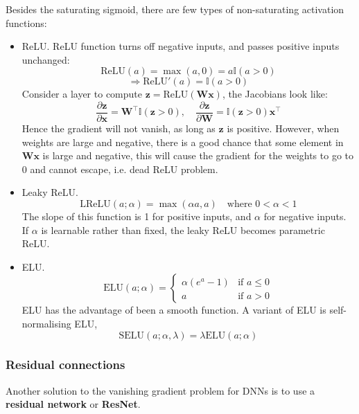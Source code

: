 \documentclass[11pt]{article}
\begin{document}
Besides the saturating sigmoid, there are few types of non-saturating activation functions:
\begin{itemize}
    \item ReLU. ReLU function turns off negative inputs, and passes positive inputs unchanged:
    \[
    \text{ReLU}(a) = \max (a, 0) = a \mathbb{I}(a>0)
    \]
    \[
    \Rightarrow \text{ReLU}'(a) = \mathbb{I}(a>0)
    \]
    Consider a layer to compute $\boldsymbol{z} = \text{ReLU}(\mathbf{W} \boldsymbol{x})$, the Jacobians look like:
    \[
    \frac{\partial \boldsymbol{z}}{\partial \boldsymbol{x}} = \mathbf{W}^\top \mathbb{I}(\boldsymbol{z} > 0) , \quad
    \frac{\partial \boldsymbol{z}}{\partial \mathbf{W}} = \mathbb{I}(\boldsymbol{z} > 0) \boldsymbol{x}^\top
    \]
    Hence the gradient will not vanish, as long as $\boldsymbol{z}$ is positive. However, when weights are large and negative,
    there is a good chance that some element in $\mathbf{W} \boldsymbol{x}$ is large and negative, this will cause the gradient for the weights to go to 0
    and cannot escape, i.e. dead ReLU problem.
    \item Leaky ReLU.
    \[
    \text{LReLU}(a;\alpha) = \max (\alpha a, a) \quad \text{where} \, \, 0 < \alpha < 1
    \]
    The slope of this function is 1 for positive inputs, and $\alpha$ for negative inputs.
    If $\alpha$ is learnable rather than fixed, the leaky ReLU becomes parametric ReLU.
    \item ELU.
    \[
    \text{ELU}(a; \alpha) = \begin{cases} \alpha(e^a - 1) & \text{if } a \leq 0 \\ a & \text{if } a > 0 \end{cases}
    \]
    ELU has the advantage of been a smooth function.
    A variant of ELU is self-normalising ELU, 
    \[
    \text{SELU}(a; \alpha, \lambda) = \lambda \text{ELU}(a; \alpha)
    \]
\end{itemize}

\subsubsection{Residual connections}
Another solution to the vanishing gradient problem for DNNs is to use a \textbf{residual network} or \textbf{ResNet}.
\end{document}

